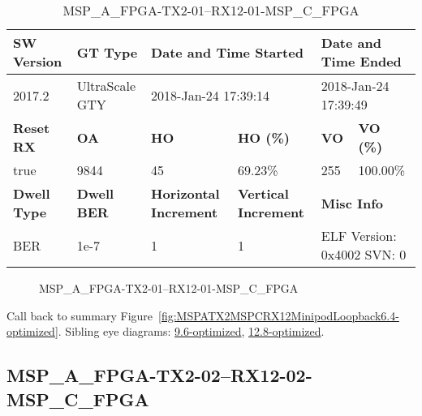 \begin{table}[h]
\centering
\caption{MSP\_A\_FPGA-TX2-01--RX12-01-MSP\_C\_FPGA}
\label{tab:MSPAFPGATX201RX1201MSPCFPGA6.4-optimized}
\begin{tabular}{@{}|l|l|l|l|l|l|@{}}
\toprule
\textbf{SW Version}                & \textbf{GT Type}   & \multicolumn{2}{l|}{\textbf{Date and Time Started}}            & \multicolumn{2}{l|}{\textbf{Date and Time Ended}}        \\ \midrule
2017.2                       & UltraScale GTY          & \multicolumn{2}{l|}{2018-Jan-24 17:39:14}                   & \multicolumn{2}{l|}{2018-Jan-24 17:39:49}               \\ \midrule
\textbf{Reset RX}                  & \textbf{OA} & \textbf{HO}   & \textbf{HO (\%)} & \textbf{VO} & \textbf{VO (\%)} \\ \midrule
true & 9844        & 45          & 69.23\%        & 255        & 100.00\%       \\ \midrule
\textbf{Dwell Type}                & \textbf{Dwell BER} & \textbf{Horizontal Increment} & \textbf{Vertical Increment}    & \multicolumn{2}{l|}{\textbf{Misc Info}}                  \\ \midrule
BER                            & 1e-7        & 1        & 1           & \multicolumn{2}{l|}{ELF Version: 0x4002 SVN: 0}                         \\ \bottomrule
\end{tabular}
\end{table}

\begin{figure}[h]
\caption{MSP\_A\_FPGA-TX2-01--RX12-01-MSP\_C\_FPGA} \label{fig:MSPAFPGATX201RX1201MSPCFPGA6.4-optimized}
\end{figure}

Call back to summary Figure~\ref{fig:MSPATX2MSPCRX12MinipodLoopback6.4-optimized}.
Sibling eye diagrams: \hyperref[sec:MSPAFPGATX201RX1201MSPCFPGA9.6-optimized]{9.6-optimized}, \hyperref[sec:MSPAFPGATX201RX1201MSPCFPGA12.8-optimized]{12.8-optimized}.

\clearpage
\newpage


\subsection{MSP\_A\_FPGA-TX2-02--RX12-02-MSP\_C\_FPGA}\label{sec:MSPAFPGATX202RX1202MSPCFPGA6.4-optimized}

